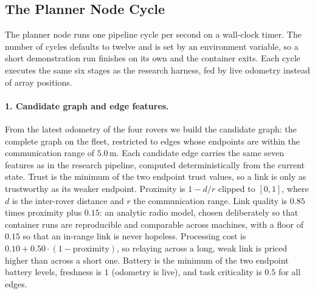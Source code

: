 
\subsection{The Planner Node Cycle}
\label{sec:gazebo:cycle}

The planner node runs one pipeline cycle per second on a wall-clock
timer. The number of cycles defaults to twelve and is set by an
environment variable, so a short demonstration run finishes on its own
and the container exits. Each cycle executes the same six stages as the
research harness, fed by live odometry instead of array positions.

\paragraph{1. Candidate graph and edge features.}
From the latest odometry of the four rovers we build the candidate graph:
the complete graph on the fleet, restricted to edges whose endpoints are
within the communication range of $5.0$\,m. Each candidate edge carries
the same seven features as in the research pipeline, computed
deterministically from the current state. Trust is the minimum of the
two endpoint trust values, so a link is only as trustworthy as its
weaker endpoint. Proximity is $1 - d/r$ clipped to $[0,1]$, where $d$ is
the inter-rover distance and $r$ the communication range. Link quality
is $0.85$ times proximity plus $0.15$: an analytic radio model, chosen
deliberately so that container runs are reproducible and comparable
across machines, with a floor of $0.15$ so that an in-range link is
never hopeless. Processing cost is $0.10 + 0.50 \cdot (1 -
\text{proximity})$, so relaying across a long, weak link is priced
higher than across a short one. Battery is the minimum of the two
endpoint battery levels, freshness is $1$ (odometry is live), and task
criticality is $0.5$ for all edges.

